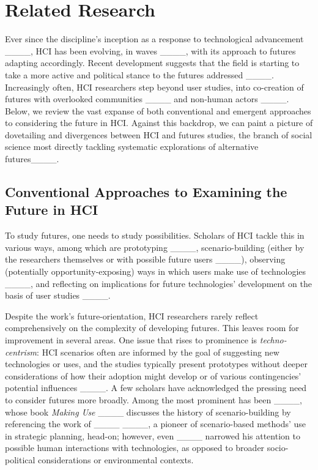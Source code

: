 \section{Related Research}
\label{sec:related-research}

Ever since the discipline's inception as a response to technological advancement ____, HCI has been evolving, in waves ____, with its approach to futures adapting accordingly.  
Recent development suggests that the field is starting to take a more active and political stance to the futures addressed ____. 
Increasingly often, HCI researchers step beyond user studies, into co-creation of futures with overlooked communities ____ and non-human actors ____.
Below, we review the vast expanse of both conventional and emergent approaches to considering the future in HCI. Against this backdrop, we can paint a picture of dovetailing and divergences between HCI and futures studies, the branch of social science most directly tackling systematic explorations of alternative futures____.

\subsection{Conventional Approaches to Examining the Future in HCI}
To study futures, one needs to study possibilities. Scholars of HCI tackle this in various ways, among which are prototyping ____, scenario-building (either by the researchers themselves or with possible future users ____), observing (potentially opportunity-exposing) ways in which users make use of technologies ____, and reflecting on implications for future technologies' development on the basis of user studies ____. 

Despite the work's future-orientation, HCI researchers rarely reflect comprehensively on the complexity of developing futures. This leaves room for improvement in several areas. One issue that rises to prominence is \emph{techno-centrism}: HCI scenarios often are informed by the goal of suggesting new technologies or uses, and the studies typically present prototypes without deeper considerations of how their adoption might develop or of various contingencies' potential influences ____. A few scholars have acknowledged the pressing need to consider futures more broadly. Among the most prominent has been ____, whose book \emph{Making Use} ____ discusses the history of scenario-building by referencing the work of ____ ____, a pioneer of scenario-based methods' use in strategic planning, head-on; however, even ____ narrowed his attention to possible human interactions with technologies, as opposed to broader socio-political considerations or environmental contexts.



